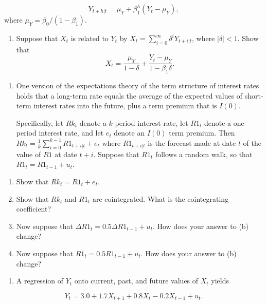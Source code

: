 \documentclass[]{book}
\providecommand{\tightlist}{%
  \setlength{\itemsep}{0pt}\setlength{\parskip}{0pt}}
\begin{document}
\[Y_{t+h|t} = \mu_Y + \beta_1^h (Y_t - \mu_Y),\] where \(\mu_Y = \beta_0/(1-\beta_1).\)

\begin{enumerate}
\def\labelenumi{\alph{enumi}.}
\setcounter{enumi}{1}
\tightlist
\item
  Suppose that \(X_t\) is related to \(Y_t\) by \(X_t = \sum_{i=0}^{\infty}\delta^i Y_{t+i|t}\), where \(|\delta|< 1\). Show that
  \[X_t = \frac{\mu_Y}{1-\delta}+\frac{Y_t-\mu_Y}{1-\beta_1\delta}.\]
\end{enumerate}

\begin{enumerate}
\def\labelenumi{\arabic{enumi}.}
\setcounter{enumi}{1}
\item
  One version of the expectations theory of the term structure of interest rates holds that a long-term rate equals the average of the expected values of short-term interest rates into the future, plus a term premium that is \(I(0)\).

  Specifically, let \(Rk_t\) denote a \(k\)-period interest rate, let \(R1_t\) denote a one-period interest rate, and let \(e_t\) denote an \(I(0)\) term premium. Then \(Rk_t=\frac{1}{k}\sum_{i=0}^{k-1}R1_{t+i|t}+e_t\) where \(R1_{t+i|t}\) is the forecast made at date \(t\) of the value of \(R1\) at date \(t + i\). Suppose that \(R1_t\) follows a random walk, so that \(R1_t = R1_{t-1} + u_t\).
\end{enumerate}

\begin{enumerate}
\def\labelenumi{\alph{enumi}.}
\tightlist
\item
  Show that \(Rk_t = R1_t + e_t\).
\item
  Show that \(Rk_t\) and \(R1_t\) are cointegrated. What is the cointegrating coefficient?
\item
  Now suppose that \(\Delta R1_t = 0.5\Delta R1_{t - 1} + u_t\). How does your answer to (b) change?
\item
  Now suppose that \(R1_t = 0.5R1_{t - 1} + u_t\). How does your answer to (b) change?
\end{enumerate}

\begin{enumerate}
\def\labelenumi{\arabic{enumi}.}
\setcounter{enumi}{2}
\tightlist
\item
  A regression of \(Y_t\) onto current, past, and future values of \(X_t\) yields
\end{enumerate}

\[Y_t = 3.0 + 1.7X_{t+1} + 0.8X_t - 0.2X_{t-1} + u_t.\]
\end{document}
